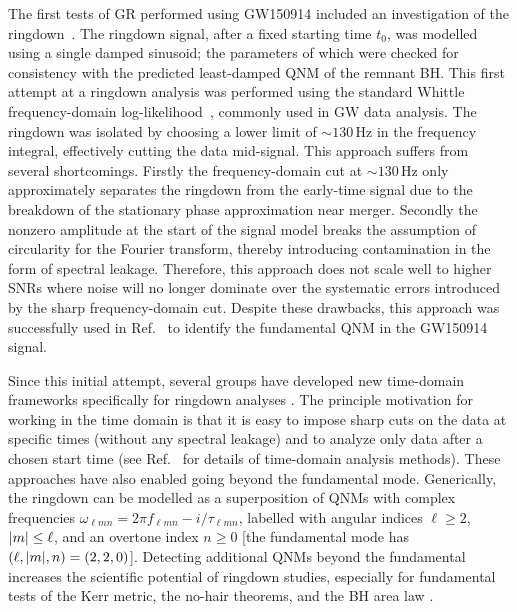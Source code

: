 The first tests of GR performed using GW150914 included an investigation of the ringdown~\cite{LIGOScientific:2016lio}. 
The ringdown signal, after a fixed starting time $t_0$, was modelled using a single damped sinusoid; the parameters of which were checked for consistency with the predicted least-damped QNM of the remnant BH.
This first attempt at a ringdown analysis was performed using the standard Whittle frequency-domain log-likelihood~\cite{10.2307/2983994}, commonly used in GW data analysis.
The ringdown was isolated by choosing a lower limit of $\sim 130\, \mathrm{Hz}$ in the frequency integral, effectively cutting the data mid-signal.
This approach suffers from several shortcomings. 
Firstly the frequency-domain cut at $\sim 130\, \mathrm{Hz}$ only approximately separates the ringdown from the early-time signal due to the breakdown of the stationary phase approximation near merger. 
Secondly the nonzero amplitude at the start of the signal model breaks the assumption of circularity for the Fourier transform, thereby introducing contamination in the form of spectral leakage. 
Therefore, this approach does not scale well to higher SNRs where noise will no longer dominate over the systematic errors introduced by the sharp frequency-domain cut.
Despite these drawbacks, this approach was successfully used in Ref.~\cite{LIGOScientific:2016lio} to identify the fundamental QNM in the GW150914 signal.

Since this initial attempt, several groups have developed new time-domain frameworks specifically for ringdown analyses \cite{Carullo:2019flw, Isi:2019aib, Capano:2021etf}.
The principle motivation for working in the time domain is that it is easy to impose sharp cuts on the data at specific times (without any spectral leakage) and to analyze only data after a chosen start time (see Ref.~\cite{Isi:2021iql} for details of time-domain analysis methods).
These approaches have also enabled going beyond the fundamental mode. 
Generically, the ringdown can be modelled as a superposition of QNMs with complex frequencies $\omega_{\ell m n} = 2\pi f_{\ell m n} - i/\tau_{\ell m n}$, labelled with angular indices $\ell\geq 2$, $\abs{m}\leq\ell$, and an overtone index $n \geq 0$ [the fundamental mode has $(\ell, \abs{m}, n) = (2, 2, 0)$].
Detecting additional QNMs beyond the fundamental increases the scientific potential of ringdown studies, especially for fundamental tests of the Kerr metric, the no-hair theorems, and the BH area law \cite{Dreyer:2003bv, Berti:2005ys, Gossan:2011ha, Brito:2018rfr, Carullo:2019flw, Isi:2019aib, Isi:2020tac}.

